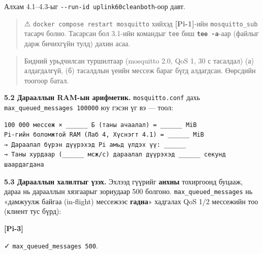 Алхам 4.1--4.3-ыг \texttt{-\/\allowbreak{}-run-id\ uplink60cleanboth}-оор давт.

\begin{quote}
⚠ \texttt{docker\ compose\ restart\ mosquitto} хийхэд \textbf{{[}Pi-1{]}}-ийн \texttt{mosquitto\_sub} тасарч болно. Тасарсан бол 3.1-ийн командыг \texttt{tee} биш \textbf{\texttt{tee\ -a}}-аар (файлыг дарж бичихгүйн тулд) дахин асаа.
\end{quote}

\begin{quote}
Бидний урьдчилсан туршилтаар (mosquitto 2.0, QoS 1, 30 с тасалдал) (а) алдагдалгүй, (б) тасалдлын үеийн мессеж бараг бүгд алдагдсан. Өөрсдийн тоогоор батал.
\end{quote}

\textbf{5.2 Дарааллын RAM-ын арифметик.} \texttt{mosquitto.conf} дахь \texttt{max\_\allowbreak{}queued\_\allowbreak{}messages\ 100000} юу гэсэн үг вэ --- тоол:

\begin{verbatim}
100 000 мессеж × ______ Б (таны ачаалал) = ______ MiB
Pi-гийн боломжтой RAM (Лаб 4, Хүснэгт 4.1) = ______ MiB
→ Дараалал бүрэн дүүрэхэд Pi амьд үлдэх үү: ______
→ Таны хурдаар (______ мсж/с) дараалал дүүрэхэд ______ секунд шаардагдана
\end{verbatim}

\textbf{5.3 Дарааллын халилтыг үзэх.} Эхлээд гүүрийг \textbf{анхны} тохиргоонд буцааж, дараа нь дарааллын хязгаарыг зориудаар 500 болгоно. \texttt{max\_\allowbreak{}queued\_\allowbreak{}messages} нь «дамжуулж байгаа (in-flight) мессежээс \textbf{гадна}» хадгалах QoS 1/2 мессежийн тоо (клиент тус бүрд):

\textbf{{[}Pi-3{]}}

\begin{Shaded}
\begin{Highlighting}[]
 
\end{Highlighting}
\end{Shaded}

✓ \texttt{max\_\allowbreak{}queued\_\allowbreak{}messages\ 500}.

